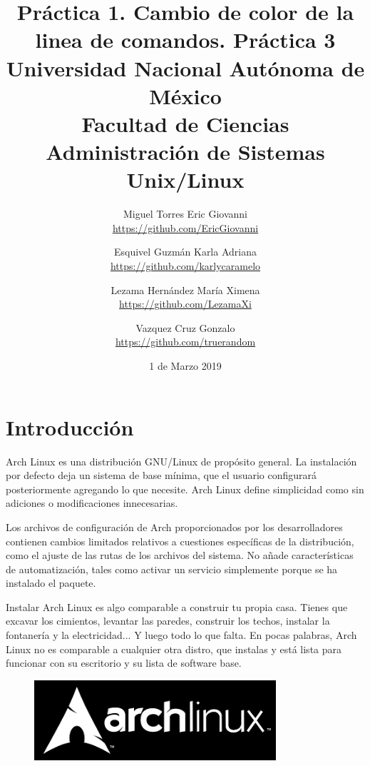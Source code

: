 \documentclass[11pt,letterpaper]{article}
\title{Práctica 1. Cambio de color de la linea de comandos.}
\begin{document}
\title{\vspace{-1.5cm}
	Práctica 3\\
    \large Universidad Nacional Autónoma de México\\
    Facultad de Ciencias\\
    Administración de Sistemas Unix/Linux\\
}
\author{
    Miguel Torres Eric Giovanni\\
    \url{https://github.com/EricGiovanni} \and
    Esquivel Guzmán Karla Adriana \\
    \url{https://github.com/karlycaramelo} \and
    Lezama Hernández María Ximena\\
    \url{https://github.com/LezamaXi} \\ \and
    Vazquez Cruz Gonzalo\\
    \url{https://github.com/truerandom} \\
    }
\date{1 de Marzo 2019}
\maketitle


\section{Introducción}

Arch Linux es una distribución GNU/Linux de propósito general. La instalación por defecto deja un sistema de base mínima, que el usuario configurará posteriormente agregando lo que necesite. Arch Linux define simplicidad como sin adiciones o modificaciones innecesarias. 

Los archivos de configuración de Arch proporcionados por los desarrolladores contienen cambios limitados relativos a cuestiones específicas de la distribución, como el ajuste de las rutas de los archivos del sistema. No añade características de automatización, tales como activar un servicio simplemente porque se ha instalado el paquete. 

Instalar Arch Linux es algo comparable a construir tu propia casa. Tienes que excavar los cimientos, levantar las paredes, construir los techos, instalar la fontanería y la electricidad... Y luego todo lo que falta. En pocas palabras, Arch Linux no es comparable a cualquier otra distro, que instalas y está lista para funcionar con su escritorio y su lista de software base.
 \begin{figure}[H]
        \centering
        \includegraphics[width=0.8\textwidth]{img/1.png}
        \label{img:Imagen 1}
\end{figure}
\end{document}
